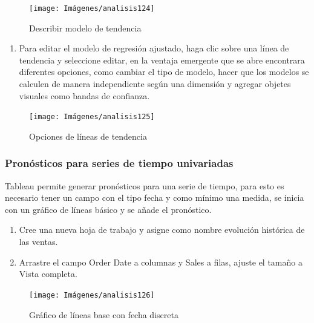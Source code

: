 \documentclass[
]{book}
\providecommand{\tightlist}{%
  \setlength{\itemsep}{0pt}\setlength{\parskip}{0pt}}
\begin{document}
\begin{figure}

{\centering \texttt{[image: Imágenes/analisis124]} 

}

\caption{Describir modelo de tendencia}\label{fig:paso9dispersion-fig}
\end{figure}

\begin{enumerate}
\def\labelenumi{\arabic{enumi}.}
\setcounter{enumi}{9}
\tightlist
\item
  Para editar el modelo de regresión ajustado, haga clic sobre una línea de tendencia y seleccione editar, en la ventaja emergente que se abre encontrara diferentes opciones, como cambiar el tipo de modelo, hacer que los modelos se calculen de manera independiente según una dimensión y agregar objetes visuales como bandas de confianza.
\end{enumerate}

\begin{figure}

{\centering \texttt{[image: Imágenes/analisis125]} 

}

\caption{Opciones de líneas de tendencia}\label{fig:paso10dispersion-fig}
\end{figure}

\hypertarget{pronuxf3sticos-para-series-de-tiempo-univariadas}{%
\subsubsection{Pronósticos para series de tiempo univariadas}\label{pronuxf3sticos-para-series-de-tiempo-univariadas}}

Tableau permite generar pronósticos para una serie de tiempo, para esto es necesario tener un campo con el tipo fecha y como mínimo una medida, se inicia con un gráfico de líneas básico y se añade el pronóstico.

\begin{enumerate}
\def\labelenumi{\arabic{enumi}.}
\item
  Cree una nueva hoja de trabajo y asigne como nombre evolución histórica de las ventas.
\item
  Arrastre el campo Order Date a columnas y Sales a filas, ajuste el tamaño a Vista completa.
\end{enumerate}

\begin{figure}

{\centering \texttt{[image: Imágenes/analisis126]} 

}

\caption{Gráfico de líneas base con fecha discreta}\label{fig:paso2pronosticos-fig}
\end{figure}
\end{document}
